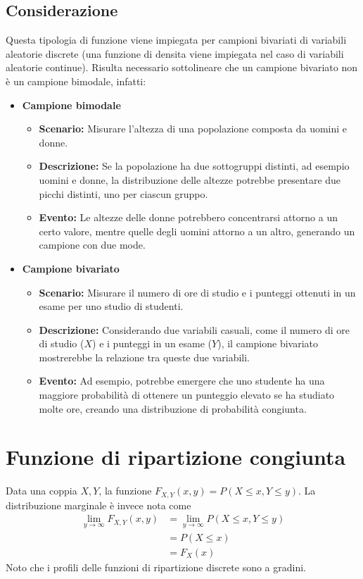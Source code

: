 \documentclass[11pt]{report}
\begin{document}
\subsection{Considerazione}
Questa tipologia di funzione viene impiegata per campioni bivariati di variabili aleatorie discrete (una funzione di densita viene impiegata nel caso di variabili aleatorie continue). Risulta necessario sottolineare che un campione bivariato non è un campione bimodale, infatti:
\begin{itemize}
	\item \textbf{Campione bimodale}
	\begin{itemize}
		\item \textbf{Scenario:} Misurare l'altezza di una popolazione composta da uomini e donne.
		\item \textbf{Descrizione:} Se la popolazione ha due sottogruppi distinti, ad esempio uomini e donne, la distribuzione delle altezze potrebbe presentare due picchi distinti, uno per ciascun gruppo.
		\item \textbf{Evento:} Le altezze delle donne potrebbero concentrarsi attorno a un certo valore, mentre quelle degli uomini attorno a un altro, generando un campione con due mode.
	\end{itemize}
	\item \textbf{Campione bivariato}
	\begin{itemize}
		\item \textbf{Scenario:} Misurare il numero di ore di studio e i punteggi ottenuti in un esame per uno studio di studenti.
		\item \textbf{Descrizione:} Considerando due variabili casuali, come il numero di ore di studio ($X$) e i punteggi in un esame ($Y$), il campione bivariato mostrerebbe la relazione tra queste due variabili.
		\item \textbf{Evento:} Ad esempio, potrebbe emergere che uno studente ha una maggiore probabilità di ottenere un punteggio elevato se ha studiato molte ore, creando una distribuzione di probabilità congiunta.
	\end{itemize}
\end{itemize}

\section{Funzione di ripartizione congiunta}
Data una coppia $X,Y$, la funzione $F_{X,Y}(x,y) = P(X \leq x, Y \leq y)$. La distribuzione marginale è invece nota come 
\begin{equation}
    \begin{split}
        \lim_{y \to \infty} F_{X,Y}(x,y) & = \lim_{y \to \infty} P(X \leq x, Y \leq y)\\
        & = P(X \leq x)\\
        & = F_X(x)
    \end{split}
\end{equation}
Noto che i profili delle funzioni di ripartizione discrete sono a gradini.
\end{document}

